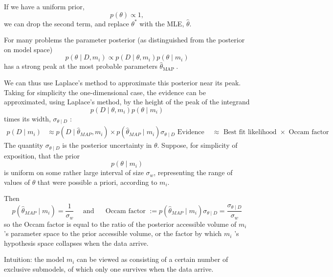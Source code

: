 \documentclass[11pt]{article}
\theoremstyle{plain} %
\theoremstyle{remark}
\begin{document}
If we have a uniform prior,
$$
  p(\theta) \propto 1,
$$
we can drop the second term, and replace $\theta^{*}$ with the MLE,
$\hat{\theta}$.

For many problems the parameter posterior (as distinguished from the
posterior on model space)
$$
  p\left(\theta \mid D, m_{i}\right) \propto p\left(D \mid \theta, m_{i}\right) p\left(\theta \mid m_{i}\right)
$$
has a strong peak at the most probable parameters $\hat{\theta}_{\text {MAP }}$.

We can thus use Laplace's method to approximate this posterior near its
peak. Taking for simplicity the one-dimensional case, the evidence can be
approximated, using Laplace's method, by the height of the peak of the
integrand
$$
  p\left(D \mid \theta, m_{i}\right) p\left(\theta \mid m_{i}\right)
$$
times its width, $\sigma_{\theta \mid D}$ :
$$
\begin{aligned}
  p\left(D \mid m_{i}\right) &\approx p\left(D \mid \hat{\theta}_{M A P}, m_{i}\right) \times p\left(\hat{\theta}_{M A P} \mid m_{i}\right) \sigma_{\theta \mid D}
  \text{ Evidence } &\approx \text{ Best fit likelihood } \times \text{ Occam factor }
\end{aligned}
$$
The quantity $\sigma_{\theta \mid D}$ is the posterior uncertainty in
$\theta$. Suppose, for simplicity of exposition, that the prior
$$
  p\left(\theta \mid m_{i}\right)
$$
is uniform on some rather large interval of size $\sigma_{w}$, representing the
range of values of $\theta$ that were possible a priori, according to $m_{i}$.

Then
$$
  p\left(\hat{\theta}_{M A P} \mid m_{i}\right)=\frac{1}{\sigma_{w}} 
  \quad \text{ and } \quad 
  \text { Occam factor } :=p\left(\hat{\theta}_{M A P} \mid m_{i}\right) \sigma_{\theta \mid D} = \frac{\sigma_{\theta \mid D}}{\sigma_{w}}
$$
so the Occam factor is equal to the ratio of the posterior accessible volume of
$m_{i}$ 's parameter space to the prior accessible volume, or the factor by
which $m_{i}$ 's hypothesis space collapses when the data arrive.

Intuition: the model $m_{i}$ can be viewed as consisting of a certain
number of exclusive submodels, of which only one survives when the data
arrive.
\end{document}
